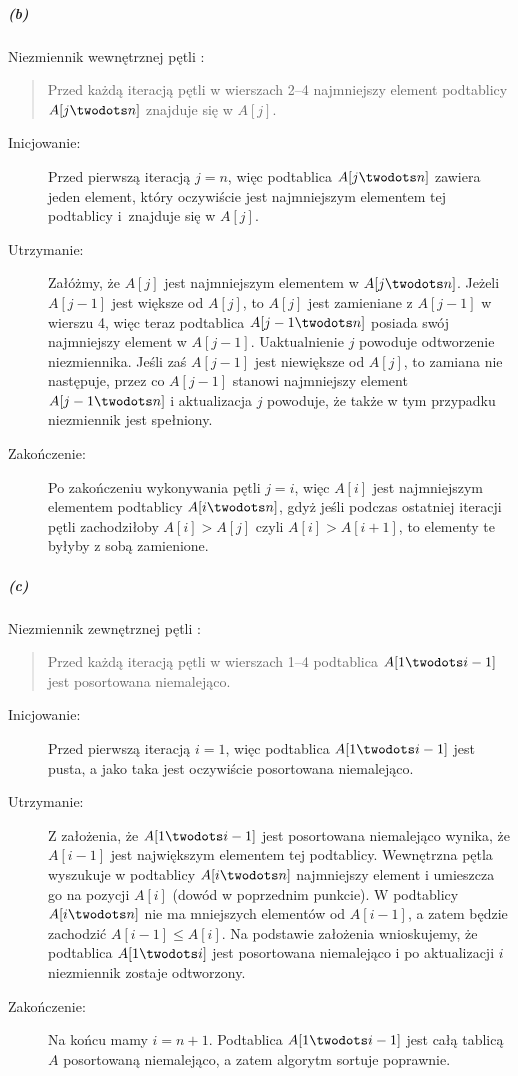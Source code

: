 \subparagraph{(b)}
Niezmiennik wewnętrznej pętli :
\begin{quote}
Przed każdą iteracją pętli  w wierszach 2--4 najmniejszy element podtablicy $A[j\twodots n]$ znajduje się w $A[j]$.
\end{quote}
\begin{description}
 \item[Inicjowanie:] Przed pierwszą iteracją $j=n$, więc podtablica $A[j\twodots n]$ zawiera jeden element, który oczywiście jest najmniejszym elementem tej podtablicy i~znajduje się w $A[j]$.
 \item[Utrzymanie:] Załóżmy, że $A[j]$ jest najmniejszym elementem w $A[j\twodots n]$. Jeżeli $A[j-1]$ jest większe od $A[j]$, to $A[j]$ jest zamieniane z $A[j-1]$ w wierszu 4, więc teraz podtablica $A[j-1\twodots n]$ posiada swój najmniejszy element w $A[j-1]$. Uaktualnienie $j$ powoduje odtworzenie niezmiennika. Jeśli zaś $A[j-1]$ jest niewiększe od $A[j]$, to zamiana nie następuje, przez co $A[j-1]$ stanowi najmniejszy element $A[j-1\twodots n]$ i aktualizacja $j$ powoduje, że także w tym przypadku niezmiennik jest spełniony.
 \item[Zakończenie:] Po zakończeniu wykonywania pętli $j=i$, więc $A[i]$ jest najmniejszym elementem podtablicy $A[i\twodots n]$, gdyż jeśli podczas ostatniej iteracji pętli zachodziłoby $A[i]>A[j]$ czyli $A[i]>A[i+1]$, to elementy te byłyby z sobą zamienione.
\end{description}

\subparagraph{(c)}
Niezmiennik zewnętrznej pętli :
\begin{quote}
Przed każdą iteracją pętli  w wierszach 1--4 podtablica $A[1\twodots i-1]$ jest posortowana niemalejąco.
\end{quote}
\begin{description}
\item[Inicjowanie:] Przed pierwszą iteracją $i=1$, więc podtablica $A[1\twodots i-1]$ jest pusta, a jako taka jest oczywiście posortowana niemalejąco.
 \item[Utrzymanie:] Z założenia, że $A[1\twodots i-1]$ jest posortowana niemalejąco wynika, że $A[i-1]$ jest największym elementem tej podtablicy. Wewnętrzna pętla  wyszukuje w podtablicy $A[i\twodots n]$ najmniejszy element i umieszcza go na pozycji $A[i]$ (dowód w poprzednim punkcie). W podtablicy $A[i\twodots n]$ nie ma mniejszych elementów od $A[i-1]$, a zatem będzie zachodzić $A[i-1]\le A[i]$. Na podstawie założenia wnioskujemy, że podtablica $A[1\twodots i]$ jest posortowana niemalejąco i po aktualizacji $i$ niezmiennik zostaje odtworzony.
 \item[Zakończenie:] Na końcu mamy $i=n+1$. Podtablica $A[1\twodots i-1]$ jest całą tablicą $A$ posortowaną niemalejąco, a zatem algorytm sortuje poprawnie.
\end{description}

